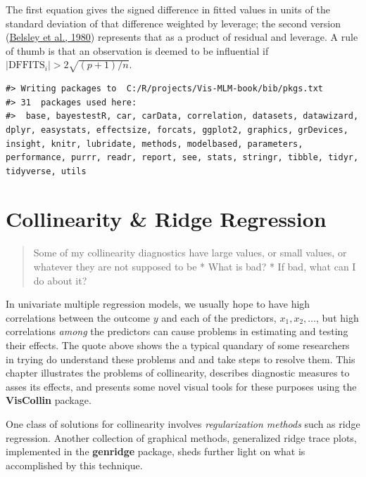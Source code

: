 \documentclass[
  letterpaper,
  10pt,
  krantz2]{krantz}
\begin{document}
The first equation gives the signed difference in fitted values in units
of the standard deviation of that difference weighted by leverage; the
second version (\protect\hyperlink{ref-Belsley-etal:80}{Belsley et al.,
1980}) represents that as a product of residual and leverage. A rule of
thumb is that an observation is deemed to be influential if
\(| \text{DFFITS}_i | > 2 \sqrt{(p+1) / n}\).

\begin{verbatim}
#> Writing packages to  C:/R/projects/Vis-MLM-book/bib/pkgs.txt
#> 31  packages used here:
#>  base, bayestestR, car, carData, correlation, datasets, datawizard, dplyr, easystats, effectsize, forcats, ggplot2, graphics, grDevices, insight, knitr, lubridate, methods, modelbased, parameters, performance, purrr, readr, report, see, stats, stringr, tibble, tidyr, tidyverse, utils
\end{verbatim}


\hypertarget{sec-collin}{%
\chapter{Collinearity \& Ridge Regression}\label{sec-collin}}

\begin{quote}
Some of my collinearity diagnostics have large values, or small values,
or whatever they are not supposed to be * What is bad? * If bad, what
can I do about it?
\end{quote}

In univariate multiple regression models, we usually hope to have high
correlations between the outcome \(y\) and each of the predictors,
\(x_1, x_2, \dots\), but high correlations \emph{among} the predictors
can cause problems in estimating and testing their effects. The quote
above shows the a typical quandary of some researchers in trying do
understand these problems and and take steps to resolve them. This
chapter illustrates the problems of collinearity, describes diagnostic
measures to asses its effects, and presents some novel visual tools for
these purposes using the \textbf{VisCollin} package.

One class of solutions for collinearity involves \emph{regularization
methods} such as ridge regression. Another collection of graphical
methods, generalized ridge trace plots, implemented in the
\textbf{genridge} package, sheds further light on what is accomplished
by this technique.
\end{document}

